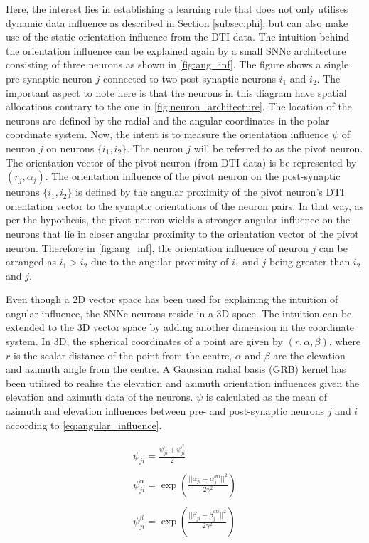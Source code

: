 Here, the interest lies in establishing a learning rule that does not only utilises dynamic data influence as described in Section \ref{subsec:phi}, but can also make use of the static orientation influence from the DTI data. The intuition behind the orientation influence can be explained again by a small SNNc architecture consisting of three neurons as shown in \figurename \ref{fig:ang_inf}. The figure shows a single pre-synaptic neuron $j$ connected to two post synaptic neurons $i_1$ and $i_2$. The important aspect to note here is that the neurons in this diagram have spatial allocations contrary to the one in \figurename \ref{fig:neuron_architecture}. The location of the neurons are defined by the radial and the angular coordinates in the polar coordinate system. Now, the intent is to measure the orientation influence $\psi$ of neuron $j$ on neurons $\{i_1, i_2\}$. The neuron $j$ will be referred to as the pivot neuron. The orientation vector of the pivot neuron (from DTI data) is be represented by $(r_j, \alpha_j)$. The orientation influence of the pivot neuron on the post-synaptic neurons $\{i_1,i_2\}$ is defined by the angular proximity of the pivot neuron's DTI orientation vector to the synaptic orientations of the neuron pairs.  In that way, as per the hypothesis, the pivot neuron wields a stronger angular influence on the neurons that lie in closer angular proximity to the orientation vector of the pivot neuron. Therefore in \figurename \ref{fig:ang_inf}, the orientation influence of neuron $j$ can be arranged as $i_1>i_2$ due to the angular proximity of $i_1$ and $j$ being greater than $i_2$ and $j$. 

Even though a 2D vector space has been used for explaining the intuition of angular influence, the SNNc neurons reside in a 3D space. The intuition can be extended to the 3D vector space by adding another dimension in the coordinate system. In 3D, the spherical coordinates of a point are given by $(r,\alpha, \beta)$, where $r$ is the scalar distance of the point from the centre, $\alpha$ and $\beta$ are the elevation and azimuth angle from the centre. A Gaussian radial basis (GRB) kernel has been utilised to realise the elevation and azimuth orientation influences given the elevation and azimuth data of the neurons. $\psi$ is calculated as the mean of azimuth and elevation influences between pre- and post-synaptic neurons $j$ and $i$ according to \equationname \ref{eq:angular_influence}.

\begin{equation}
\begin{matrix}
\psi_{ji}=\frac{\psi_{ji}^\alpha+\psi_{ji}^\beta}{2} \\ \\

\psi_{ji}^\alpha=\exp(\frac{||\alpha_{ji}-\alpha_j^{dti}||^2}{2\gamma^2})\\ \\

\psi_{ji}^\beta=\exp(\frac{||\beta_{ji}-\beta_j^{dti}||^2}{2\gamma^2})

\end{matrix}
\label{eq:angular_influence}
\end{equation} 

